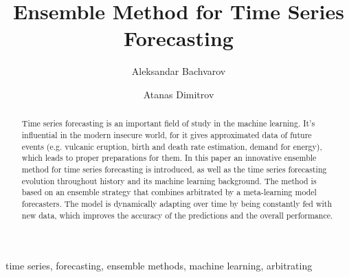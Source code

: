 \documentclass[runningheads,a4paper]{llncs}[2015/06/24]
\begin{document}
\title{Ensemble Method for Time Series Forecasting}

\author{Aleksandar Bachvarov \and Atanas Dimitrov}

%

			
\maketitle

\begin{abstract}
Time series forecasting is an important field of study in the machine learning. It's influential in the modern insecure world, for it gives approximated data of future events (e.g. vulcanic eruption, birth and death rate estimation, demand for energy), which leads to proper preparations for them. In this paper an innovative ensemble method for time series forecasting is introduced, as well as the time series forecasting evolution throughout history and its machine learning background. The method is based on an ensemble strategy that combines arbitrated by a meta-learning model forecasters. The model is dynamically adapting over time by being constantly fed with new data, which improves the accuracy of the predictions and the overall performance.
\end{abstract}

\begin{keywords}
time series, forecasting, ensemble methods, machine learning, arbitrating  
\end{keywords}
\end{document}
